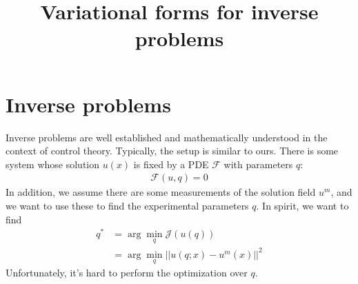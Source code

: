 \documentclass{article}
\title{Variational forms for inverse problems}
\begin{document}
\section{Inverse problems}
Inverse problems are well established and mathematically understood in the context of control theory. Typically, the setup is similar to ours. There is some system whose solution $u(x)$ is fixed by a PDE $\mathcal{F}$ with parameters $q$:
\begin{align*}
    \mathcal{F}(u, q) = 0
\end{align*}
In addition, we assume there are some measurements of the solution field $u^m$, and we want to use these to find the experimental parameters $q$. In spirit, we want to find 
\begin{align*}
    q^* &= \arg\min_q\mathcal{J}(u(q))
    \\
    &= \arg\min_q ||u(q; x) - u^m(x)||^2
\end{align*}
Unfortunately, it's hard to perform the optimization over $q$.
\end{document}
